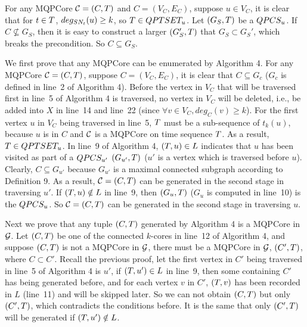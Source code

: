 \documentclass[conference]{IEEEtran}
\newcommand{\mqpcore}{Algorithm 4\xspace}
\newcommand{\defconnectedlocalperiodic}{Definition 9\xspace}
\begin{document}
	 For any MQPCore $ \mathcal{C}=(C,T) $ and $ C=(V_C,E_C) $, suppose $ u\in V_C $, it is clear that for $ t\in T $, $ deg_{SN_t}(u)\geq k $, so $ T\in QPTSET_u $. Let $ (G_S,T) $ be a $ QPCS_u $. If $ C\nsubseteq G_S $, then it is easy to construct a larger \qpcsg $ (G_S',T) $ that $ G_S\subset G_S' $, which breaks the precondition. So $ C\subseteq G_S $.
	
	 We first prove that any MQPCore can be enumerated by \mqpcore. For any MQPCore $ \mathcal{C}=(C,T) $, suppose $ C=(V_C,E_C) $, it is clear that $ C\subseteq G_c $ ($ G_c $ is defined in line~2 of \mqpcore). Before the vertex in $ V_C $ that will be traversed first in line~5 of \mqpcore is traversed, no vertex in $ V_C $ will be deleted, i.e., be added into $ X $ in line~14 and line~22 (since $ \forall v \in V_C, deg_{C}(v)\geq k $). For the first vertex $ u $ in $ V_C $ being traversed in line~5, $ T $ must be a sub-sequence of $ t_k(u) $, because $ u $ is in $ C $ and $ \mathcal{C} $ is a MQPCore on time sequence $ T $. As a result, $ T\in QPTSET_u $. In line~9 of \mqpcore, $ (T,u)\in L $ indicates that $ u $ has been visited as part of a $ QPCS_{u'} $ $ (G_{u'},T) $ ($ u' $ is a vertex which is traversed before $ u $). Clearly, $ C\subseteq G_{u'} $ because $ G_{u'} $ is a maximal connected subgraph according to \defconnectedlocalperiodic. As a result, $ \mathcal{C}=(C,T) $ can be generated in the second stage in traversing $ u' $. If $ (T,u)\notin L $ in line~9, then $ (G_u,T) $ ($ G_u $ is computed in line~10) is the $ QPCS_u $. So $ \mathcal{C}=(C,T) $ can be generated in the second stage in traversing $ u $.
	
	Next we prove that any tuple $ (C,T) $ generated by \mqpcore is a MQPCore in $ \mathcal{G} $. Let $ (C,T) $ be one of the connected $ k $-cores in line~12 of \mqpcore, and suppose $ (C,T) $ is not a MQPCore in $ \mathcal{G} $, there must be a MQPCore in $ \mathcal{G} $, $ (C',T) $, where $ C\subset C' $. Recall the previous proof, let the first vertex in $ C' $ being traversed in line~5 of \mqpcore is $ u' $, if $ (T,u')\in L $ in line~9, then some \qpcsg containing $ C' $ has being generated before, and for each vertex $ v $ in $ C' $, $ (T,v)$ has been recorded in $ L $ (line~11) and will be skipped later. So we can not obtain $ (C,T) $ but only $ (C',T) $, which contradicts the conditions before. It is the same that only $ (C',T) $ will be generated if $ (T,u')\notin L $.
	
\end{document}
